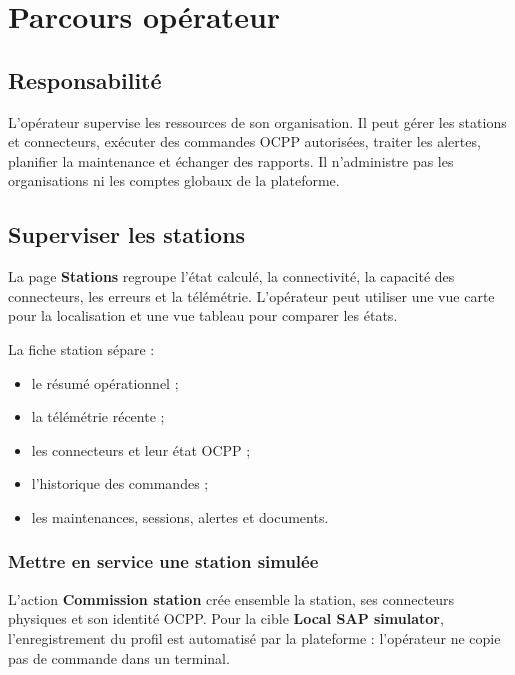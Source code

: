 \chapter{Parcours opérateur}

\section{Responsabilité}

L'opérateur supervise les ressources de son organisation. Il peut gérer les
stations et connecteurs, exécuter des commandes OCPP autorisées, traiter les
alertes, planifier la maintenance et échanger des rapports. Il n'administre pas
les organisations ni les comptes globaux de la plateforme.


\section{Superviser les stations}

La page \textbf{Stations} regroupe l'état calculé, la connectivité, la capacité
des connecteurs, les erreurs et la télémétrie. L'opérateur peut utiliser une vue
carte pour la localisation et une vue tableau pour comparer les états.

La fiche station sépare :

\begin{itemize}[leftmargin=1.6em]
  \item le résumé opérationnel ;
  \item la télémétrie récente ;
  \item les connecteurs et leur état OCPP ;
  \item l'historique des commandes ;
  \item les maintenances, sessions, alertes et documents.
\end{itemize}

\subsection{Mettre en service une station simulée}

L'action \textbf{Commission station} crée ensemble la station, ses connecteurs
physiques et son identité OCPP. Pour la cible \textbf{Local SAP simulator},
l'enregistrement du profil est automatisé par la plateforme : l'opérateur ne
copie pas de commande dans un terminal.

